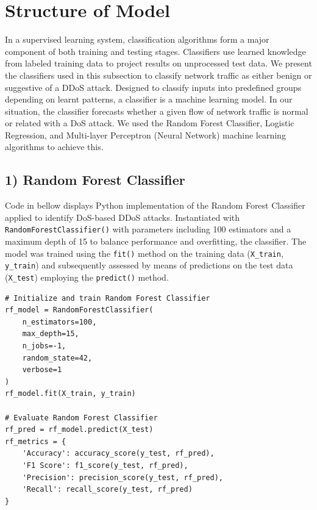 \documentclass[conference]{IEEEtran}
\begin{document}
\section{Structure of Model}

In a supervised learning system, classification algorithms form a major component of both training and testing stages. Classifiers use learned knowledge from labeled training data to project results on unprocessed test data. We present the classifiers used in this subsection to classify network traffic as either benign or suggestive of a DDoS attack. Designed to classify inputs into predefined groups depending on learnt patterns, a classifier is a machine learning model. In our situation, the classifier forecasts whether a given flow of network traffic is normal or related with a DoS attack. We used the Random Forest Classifier, Logistic Regression, and Multi-layer Perceptron (Neural Network) machine learning algorithms to achieve this.

\subsection*{1) Random Forest Classifier} Code in bellow displays Python implementation of the Random Forest Classifier applied to identify DoS-based DDoS attacks. Instantiated with \texttt{RandomForestClassifier()} with parameters including 100 estimators and a maximum depth of 15 to balance performance and overfitting, the classifier. The model was trained using the \texttt{fit()} method on the training data (\texttt{X\_train}, \texttt{y\_train}) and subsequently assessed by means of predictions on the test data (\texttt{X\_test}) employing the \texttt{predict()} method.

\begin{center}
\begin{scriptsize}
\begin{verbatim}
# Initialize and train Random Forest Classifier
rf_model = RandomForestClassifier(
    n_estimators=100,
    max_depth=15,
    n_jobs=-1,
    random_state=42,
    verbose=1
)
rf_model.fit(X_train, y_train)

# Evaluate Random Forest Classifier
rf_pred = rf_model.predict(X_test)
rf_metrics = {
    'Accuracy': accuracy_score(y_test, rf_pred),
    'F1 Score': f1_score(y_test, rf_pred),
    'Precision': precision_score(y_test, rf_pred),
    'Recall': recall_score(y_test, rf_pred)
}
\end{verbatim}
\end{scriptsize}
\end{center}
\end{document}
